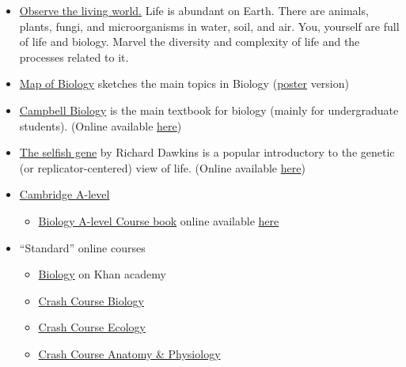 \documentclass{article}
\begin{document}
\begin{itemize}
    \item \underline{Observe the living world.} Life is abundant on Earth. There are animals, plants, fungi, and microorganisms in water, soil, and air. You, yourself are full of life and biology. Marvel the diversity and complexity of life and the processes related to it.
    
    \item \href{https://www.youtube.com/watch?v=wENhHnJI1ys}{Map of Biology} sketches the main topics in Biology (\href{https://mymodernmet.com/wp/wp-content/uploads/2018/03/infographic-map-biology.png}{poster} version)
    \item \href{https://www.goodreads.com/book/show/145806.Biology}{Campbell Biology} is the main textbook for biology (mainly for undergraduate students). (Online available \href{https://archive.org/details/neil-a.-campbell-jane-b.-reece-biology-pearson-benjamin-cummings-2005-2/}{here})
    \item \href{https://www.goodreads.com/book/show/61535.The_Selfish_Gene}{The selfish gene} by  Richard Dawkins is a popular introductory to the genetic (or replicator-centered) view of life. (Online available \href{https://archive.org/stream/pdfy-RHEZa8riPwBuUyrV#mode/2up Selfish Gene}{here})
    \item \href{https://www.cambridgeinternational.org/programmes-and-qualifications/cambridge-international-as-and-a-level-biology-9700/}{Cambridge A-level}
    \begin{itemize}
        \item \href{https://www.goodreads.com/book/show/34108108-cambridge-international-as-and-a-level-biology-workbook-with-cd-rom}{Biology A-level Course book} online available \href{https://web.archive.org/web/20201111165810/https://www.gceguide.xyz/files/e-books/a-level/Cambridge\%20International\%20AS\%20and\%20A\%20Level\%20Biology\%20Coursebook.pdf}{here}
    \end{itemize}
    
    \item ``Standard'' online courses
    \begin{itemize}
    \item \href{https://www.khanacademy.org/science/biology}{Biology} on Khan academy
    \item \href{https://www.youtube.com/playlist?list=PL3EED4C1D684D3ADF}{Crash Course Biology}
    \item \href{https://www.youtube.com/playlist?list=PL8dPuuaLjXtNdTKZkV_GiIYXpV9w4WxbX}{Crash Course Ecology}
    \item \href{https://www.youtube.com/playlist?list=PL8dPuuaLjXtOAKed_MxxWBNaPno5h3Zs8}{Crash Course Anatomy \& Physiology}
    

\end{itemize}
\end{itemize}
\end{document}
